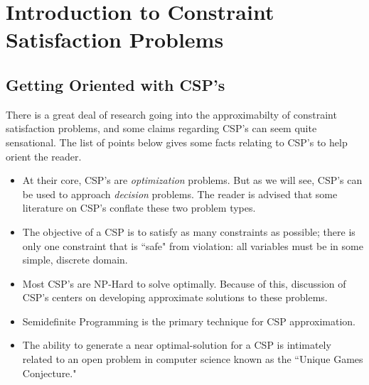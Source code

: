 %


\section{Introduction to Constraint Satisfaction Problems}

\subsection{Getting Oriented with CSP's}

There is a great deal of research going into the approximabilty of constraint satisfaction problems, and some claims regarding CSP's can seem quite sensational. 
The list of points below gives some facts relating to CSP's to help orient the reader.

\begin{itemize}
\item At their core, CSP's are \textit{optimization} problems. But as we will see, CSP's can be used to approach \textit{decision} problems. The reader is advised that some literature on CSP's conflate these two problem types.
\item The objective of a CSP is to satisfy as many constraints as possible; there is only one constraint that is ``safe" from violation: all variables must be in some simple, discrete domain.
\item Most CSP's are NP-Hard to solve optimally. Because of this, discussion of CSP's centers on developing approximate solutions to these problems.
\item Semidefinite Programming is the primary technique for CSP approximation.
\item The ability to generate a near optimal-solution for a CSP is intimately related to an open problem in computer science known as the ``Unique Games Conjecture."
\end{itemize}

